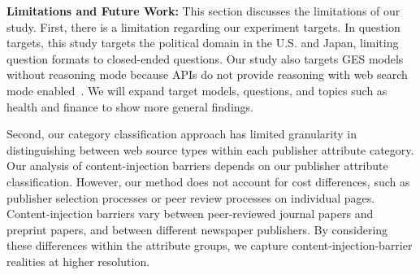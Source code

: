 

\textbf{Limitations and Future Work:}
This section discusses the limitations of our study.
First, there is a limitation regarding our experiment targets.
In question targets, this study targets the political domain in the U.S. and Japan, limiting question formats to closed-ended questions.
Our study also targets GES models without reasoning mode because APIs do not provide reasoning with web search mode enabled~\cite{openai-api-reference}.
We will expand target models, questions, and topics such as health and finance to show more general findings.

Second, our category classification approach has limited granularity in distinguishing between web source types within each publisher attribute category.
Our analysis of content-injection barriers depends on our publisher attribute classification.
However, our method does not account for cost differences, such as publisher selection processes or peer review processes on individual pages.
Content-injection barriers vary between peer-reviewed journal papers and preprint papers, and between different newspaper publishers.
By considering these differences within the attribute groups, we capture content-injection-barrier realities at higher resolution.


